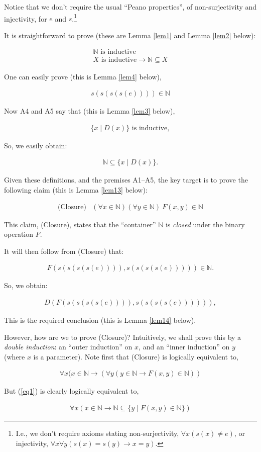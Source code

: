 \documentclass[11pt,a4paper]{article}
\newcommand{\N}{ \ensuremath{ \mathbb{N}}}
\newcommand{\beq}{\begin{eqnarray}}
\newcommand{\eeq}{\end{eqnarray}}
\theoremstyle{definition}
\begin{document}
Notice that we don't require the usual ``Peano properties'', of non-surjectivity and injectivity, for $e$ and $s$.\footnote{I.e., we don't require axioms stating non-surjectivity, $\forall x(s(x) \neq e)$, or injectivity, $\forall x \forall y(s(x) = s(y) \to x = y)$.}

It is straightforward to prove (these are Lemma \ref{lem1} and Lemma \ref{lem2} below):

\beq
\N \text{ is inductive}\\
X \text{ is inductive} \to \N \subseteq X
\eeq

One can easily prove (this is Lemma \ref{lem4} below),

\beq
s(s(s(s(e)))) \in \N
\eeq

Now A4 and A5 say that (this is Lemma \ref{lem3} below),

\beq
 \{x \mid D(x)\} \text{ is inductive},
 \eeq

So, we easily obtain: 

\beq 
\N \subseteq \{x \mid D(x)\}.
\eeq

Given these definitions, and the premises A1--A5, the key target is to prove the following claim (this is Lemma \ref{lem13} below):

\beq
\text{(Closure)} & (\forall x \in \N)(\forall y \in \N) \ F(x,y) \in \N
\eeq

This claim, (Closure), states that the ``container'' $\N$ is \emph{closed} under the binary operation $F$. 

It will then follow from (Closure) that: 

\beq
F(s(s(s(s(e)))),s(s(s(s(e))))) \in \N.
\eeq

So, we obtain:

\beq
D(F(s(s(s(s(e)))),s(s(s(s(e)))))),
\eeq

This is the required conclusion (this is Lemma \ref{lem14} below).

However, how are we to prove (Closure)? Intuitively, we shall prove this by a \emph{double induction}: an ``outer induction'' on $x$, and an ``inner induction'' on $y$ (where $x$ is a parameter). Note first that (Closure) is logically equivalent to,

\beq
\forall x  (x \in \N \to (\forall y (y \in \N \to F(x,y) \in \N)) \label{eq1}
\eeq

But (\ref{eq1}) is clearly logically equivalent to,

\beq
 \forall x  (x \in \N \to \N \subseteq \{ y \mid F(x,y) \in \N \}) \label{eq2}
\eeq
\end{document}
